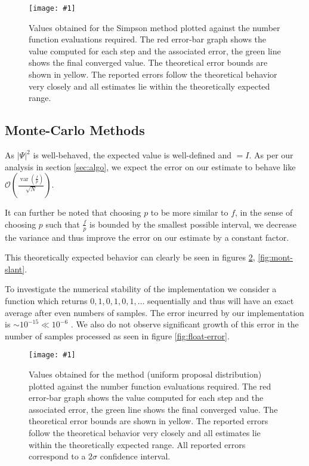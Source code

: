 \documentclass[10pt, a4paper]{article}
\newcommand{\plot}[3]{\begin{figure}[htp]\centering\texttt{[image: \#1]}\caption{#2}\label{#3}\end{figure}}
\begin{document}
  \plot{proj-simp-accuracy}{
    Values obtained for the Simpson method plotted against the number function evaluations required. The red
    error-bar graph shows the value computed for each step and the associated error, the green line
    shows the final converged value. The theoretical error bounds are shown in yellow. The reported errors
    follow the theoretical behavior very closely and all estimates lie within the theoretically expected range.
  }{fig:simp}

  \subsection{Monte-Carlo Methods}
  As $|\Psi|^2$ is well-behaved, the expected value is well-defined and $= I$. As per our
  analysis in section \ref{sec:algo}, we expect the error on our estimate to behave like
  $\mathcal{O}\left( \frac{\operatorname{var}(\frac fp)}{\sqrt N} \right)$.

  It can further be noted that choosing $p$ to be more similar to $f$, in the sense of choosing $p$
  such that $\frac fp$ is bounded by the smallest possible interval, we decrease the variance and thus
  improve the error on our estimate by a constant factor.

  This theoretically expected behavior can clearly be seen in figures \ref{fig:mont-flat}, \ref{fig:mont-slant}.

  To investigate the numerical stability of the implementation
  we consider a function which returns $0,1,0,1,0,1,\dots$ sequentially and thus will have an
  exact average after even numbers of samples. The error incurred by our implementation is
  $\sim 10^{-15} \ll 10^{-6}$ \footnotemark. We
  also do not observe significant growth of this error in the number of samples processed as
  seen in figure \ref{fig:float-error}.


  \plot{proj-mont-flat-accuracy}{
    Values obtained for the \is{} method (uniform proposal distribution) plotted against the number
    function evaluations required. The red
    error-bar graph shows the value computed for each step and the associated error, the green line
    shows the final converged value. The theoretical error bounds are shown in yellow. The reported errors
    follow the theoretical behavior very closely and all estimates lie within the theoretically expected range.
    All reported errors correspond to a $2\sigma$ confidence interval.
  }{fig:mont-flat}
\end{document}
